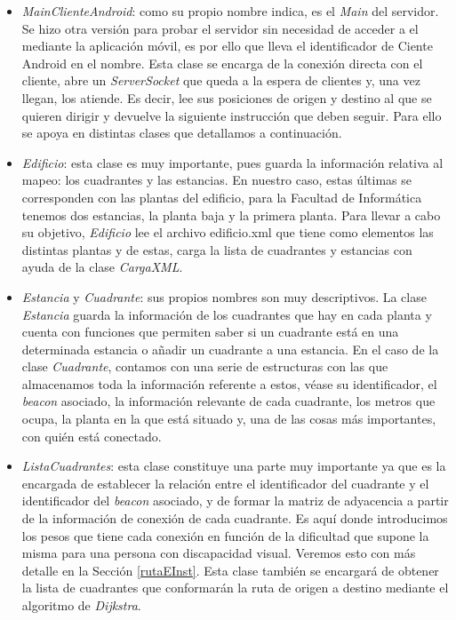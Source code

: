 \begin{itemize}
	\item \textit{MainClienteAndroid}: como su propio nombre indica, es el \textit{Main} del servidor. Se hizo otra versión para probar el servidor sin necesidad de acceder a el mediante la aplicación móvil, es por ello que lleva el identificador de Ciente Android en el nombre. Esta clase se encarga de la conexión directa con el cliente, abre un \textit{ServerSocket} que queda a la espera de clientes y, una vez llegan, los atiende. Es decir, lee sus posiciones de origen y destino al que se quieren dirigir y devuelve la siguiente instrucción que deben seguir. Para ello se apoya en distintas clases que detallamos a continuación. 
	
	\item \textit{Edificio}: esta clase es muy importante, pues guarda la información relativa al mapeo: los cuadrantes y las estancias. En nuestro caso, estas últimas se corresponden con las plantas del edificio, para la Facultad de Informática tenemos dos estancias, la planta baja y la primera planta. Para llevar a cabo su objetivo, \textit{Edificio} lee el archivo edificio.xml que tiene como elementos las distintas plantas y de estas, carga la lista de cuadrantes y estancias con ayuda de la clase \textit{CargaXML}.
	
	\item \textit{Estancia} y \textit{Cuadrante}: sus propios nombres son muy descriptivos. La clase  \textit{Estancia} guarda la información de los cuadrantes que hay en cada planta y cuenta con funciones que permiten saber si un cuadrante está en una determinada estancia o añadir un cuadrante a una estancia. En el caso de la clase \textit{Cuadrante}, contamos con una serie de estructuras con las que almacenamos toda la información referente a estos, véase su identificador, el \textit{beacon} asociado, la información relevante de cada cuadrante, los metros que ocupa, la planta en la que está situado y, una de las cosas más importantes, con quién está conectado. 
	
	\item \textit{ListaCuadrantes}: esta clase constituye una parte muy importante ya que es la encargada de establecer la relación entre el identificador del cuadrante y el identificador del \textit{beacon} asociado, y de formar la matriz de adyacencia a partir de la información de conexión de cada cuadrante. Es aquí donde introducimos los pesos que tiene cada conexión en función de la dificultad que supone la misma para una persona con discapacidad visual. Veremos esto con más detalle en la Sección \ref{rutaEInst}. Esta clase también se encargará de obtener la lista de cuadrantes que conformarán la ruta de origen a destino mediante el algoritmo de \textit{Dijkstra}.
	

\end{itemize}
